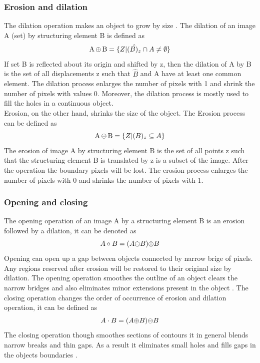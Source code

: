 \documentclass[a4paper,twoside]{article}
\begin{document}
\subsubsection{Erosion and dilation}
The dilation operation makes an object to grow by size \cite{ravi2013morphological}. The dilation of an image A (set) by structuring element B is defined as
\begin{equation}
    \ce{A {$\oplus$} B} = \{ Z | \hat{(B)_{z}} \cap A\neq \emptyset \}
\end{equation}
If set B is reflected about its origin and shifted by z, then
the dilation of A by B is the set of all displacements z such that $\hat{B}$ and A have at least one common element. The dilation process enlarges the number of pixels with 1 and shrink the number of pixels with values 0. Moreover, the dilation process is mostly used to fill the holes in a continuous object.\\
Erosion, on the other hand, shrinks the size of the object. The Erosion process can be defined as
\begin{equation}
\ce{A {$\ominus$} B} = \{ Z | (B)_z \subseteq  A \}
\end{equation}
The erosion of image A by structuring element B is the set
of all points z such that the structuring element B is translated
by z is a subset of the image. After the operation the boundary pixels will be lost. The erosion process enlarges the number of pixels with 0 and shrinks the number of pixels with 1.
\subsubsection{Opening and closing}
The opening operation of an image A by a structuring element B is an erosion followed by a dilation, it can be denoted as
\begin{equation}
    A \circ B = (A \ce{$\ominus$} B)\ce{$\oplus$} B
\end{equation}
Opening can open up a gap between objects connected by narrow brige of pixels. Any regions reserved after erosion will be restored to their original size by dilation. The opening operation smoothes the outline of an object
clears the narrow bridges and also eliminates minor extensions
present in the object \cite{ravi2013morphological}.
The closing operation changes the order of occurrence of erosion and dilation operation, it can be defined as
\begin{equation}
    A \cdot B = (A \ce{$\oplus$} B)\ce{$\ominus$} B
\end{equation}
The closing operation though smoothes sections of contours
it in general blends narrow breaks and thin gaps. As a result it
eliminates small holes and fills gaps in the objects boundaries \cite{ravi2013morphological}.  
\end{document}
